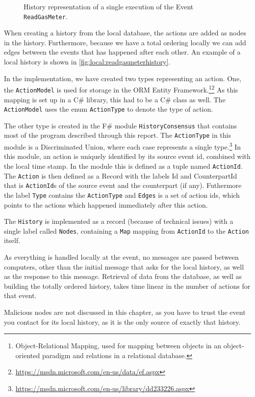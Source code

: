	\begin{figure}
		\centering
		
		\caption{History representation of a single execution of the Event \texttt{ReadGasMeter}.}
		\label{fig:local:readgasmeterhistory}
	\end{figure}
	\newpar When creating a history from the local database, the actions are added as nodes in the history. Furthermore, because we have a total ordering locally we can add edges between the events that has happened after each other. An example of a local history is shown in \autoref{fig:local:readgasmeterhistory}.
	
	\newpar In the implementation, we have created two types representing an action. One, the \texttt{ActionModel} is used for storage in the ORM Entity Framework.\footnote{Object-Relational Mapping, used for mapping between objects in an object-oriented paradigm and relations in a relational database.}\footnote{\url{https://msdn.microsoft.com/en-us/data/ef.aspx}} As this mapping is set up in a C\# library, this had to be a C\# class as well. The \texttt{ActionModel} uses the enum \texttt{ActionType} to denote the type of action.
	
	The other type is created in the F\# module \texttt{HistoryConsensus} that contains most of the program described through this report. The \texttt{ActionType} in this module is a Discriminated Union, where each case represents a single type.\footnote{\url{https://msdn.microsoft.com/en-us/library/dd233226.aspx}}
	In this module, an action is uniquely identified by its source event id, combined with the local time stamp. In the module this is defined as a tuple named \texttt{ActionId}.
	The \texttt{Action} is then defined as a Record with the labels Id and CounterpartId that is \texttt{ActionId}s of the source event and the counterpart (if any). Futhermore the label \texttt{Type} contains the \texttt{ActionType} and \texttt{Edges} is a set of action ids, which points to the actions which happened immediately after this action.
	
	The \texttt{History} is implemented as a record (because of technical issues) with a single label called \texttt{Nodes}, containing a \texttt{Map} mapping from \texttt{ActionId} to the \texttt{Action} itself.
	
	\newpar As everything is handled locally at the event, no messages are passed between computers, other than the initial message that asks for the local history, as well as the response to this message. Retrieval of data from the database, as well as building the totally ordered history, takes time linear in the number of actions for that event.
	
	\newpar Malicious nodes are not discussed in this chapter, as you have to trust the event you contact for its local history, as it is the only source of exactly that history.
